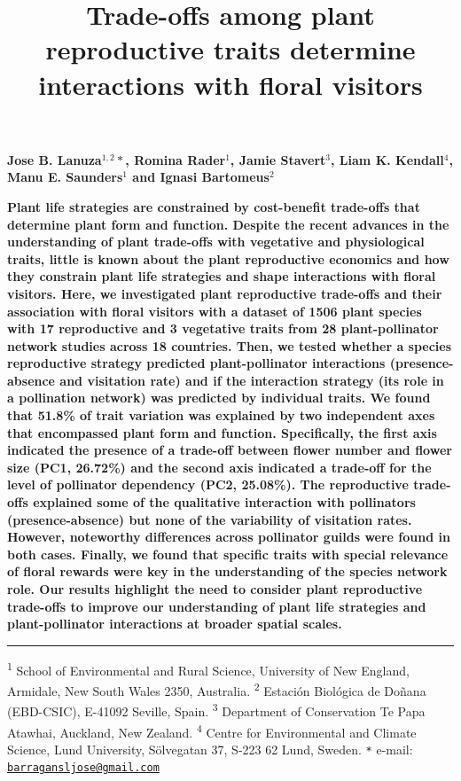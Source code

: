 \documentclass[12pt,a4paper,]{article}
\title{\singlespacing \vspace{-1.5cm} \LARGE Trade-offs among plant
reproductive traits determine interactions with floral visitors}
\author{}
\date{\vspace{-2.5em}}
\begin{document}
\maketitle

\vspace{-2.2cm} \singlespacing
\large 
\textbf{Jose B. Lanuza$^{1,2}*$, Romina Rader$^{1}$, Jamie Stavert$^{3}$, Liam K. Kendall$^{4}$, Manu E. Saunders$^{1}$ and Ignasi Bartomeus$^{2}$}

\normalsize

\textbf{Plant life strategies are constrained by cost-benefit trade-offs
that determine plant form and function. Despite the recent advances in
the understanding of plant trade-offs with vegetative and physiological
traits, little is known about the plant reproductive economics and how
they constrain plant life strategies and shape interactions with floral
visitors. Here, we investigated plant reproductive trade-offs and their
association with floral visitors with a dataset of 1506 plant species
with 17 reproductive and 3 vegetative traits from 28 plant-pollinator
network studies across 18 countries. Then, we tested whether a species
reproductive strategy predicted plant-pollinator interactions
(presence-absence and visitation rate) and if the interaction strategy
(its role in a pollination network) was predicted by individual traits.
We found that 51.8\% of trait variation was explained by two independent
axes that encompassed plant form and function. Specifically, the first
axis indicated the presence of a trade-off between flower number and
flower size (PC1, 26.72\%) and the second axis indicated a trade-off for
the level of pollinator dependency (PC2, 25.08\%). The reproductive
trade-offs explained some of the qualitative interaction with
pollinators (presence-absence) but none of the variability of visitation
rates. However, noteworthy differences across pollinator guilds were
found in both cases. Finally, we found that specific traits with special
relevance of floral rewards were key in the understanding of the species
network role. Our results highlight the need to consider plant
reproductive trade-offs to improve our understanding of plant life
strategies and plant-pollinator interactions at broader spatial scales.}

\small
\vspace{-0.5cm}

\noindent\rule{\textwidth}{1pt}

\textsuperscript{1} School of Environmental and Rural Science,
University of New England, Armidale, New South Wales 2350, Australia.
\textsuperscript{2} Estación Biológica de Doñana (EBD-CSIC), E-41092
Seville, Spain. \textsuperscript{3} Department of Conservation
\textbar{} Te Papa Atawhai, Auckland, New Zealand. \textsuperscript{4}
Centre for Environmental and Climate Science, Lund University,
Sölvegatan 37, S-223 62 Lund, Sweden. \texttt{*} e-mail:
\href{mailto:barragansljose@gmail.com}{\nolinkurl{barragansljose@gmail.com}}
\end{document}
